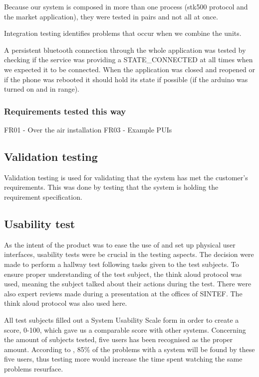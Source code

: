 			Because our system is composed in more than one process (stk500 protocol and the market application), they
			were tested in pairs and not all at once.

			Integration testing identifies problems that occur when we combine the units.

			A persistent bluetooth connection through the whole application was tested by checking if the service was providing a STATE\_CONNECTED at all times when we expected it to be connected. When the application was closed and reopened or if the phone was rebooted it should hold its state if possible (if the arduino was turned on and in range). 

			\subsubsection{Requirements tested this way}
			FR01 - Over the air installation
			FR03 - Example PUIs

		\subsection{Validation testing}
			Validation testing is used for validating that the system has met the customer's requirements. This was done by testing that the system is holding the requirement specification.


		\subsection{Usability test}
		As the intent of the product was to ease the use of and set up physical user interfaces, usability tests were be crucial in the testing aspects. The decision were made to perform a hallway test following tasks given to the test subjects. To ensure proper understanding of the test subject, the think aloud protocol was used, meaning the subject talked about their actions during the test. There were also expert reviews made during a presentation at the offices of SINTEF. The think aloud protocol was also used here.

		All test subjects filled out a System Usability Scale form in order to create a score, 0-100, which gave us a comparable score with other systems. Concerning the amount of subjects tested, five users has been recognised as the proper amount. According to \cite{Nielsen}, 85\% of the problems with a system will be found by these five users, thus testing more would increase the time spent watching the same problems resurface.

